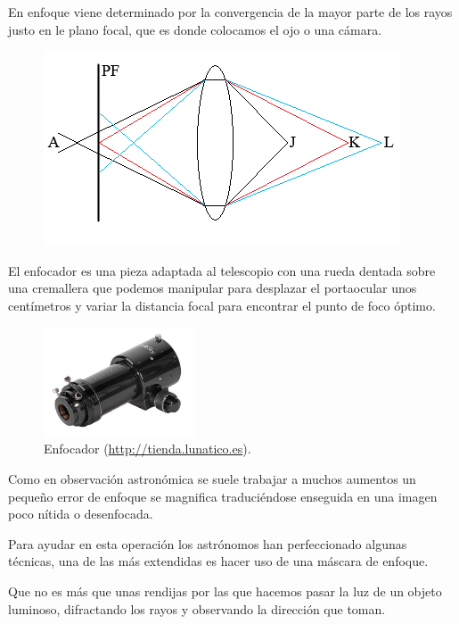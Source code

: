 En enfoque viene determinado por la convergencia de la mayor parte de los rayos justo en le plano focal, que es donde colocamos el ojo o una cámara. 

\begin{figure}[h]
\centering
\includegraphics[width=0.7\linewidth]{../images/planofocal}
\caption{}
\label{fig:planofocal}
\end{figure}

\bigskip
El enfocador es una pieza adaptada al telescopio con una rueda dentada sobre una cremallera que podemos manipular para desplazar el portaocular unos centímetros y variar la distancia focal para encontrar el punto de foco óptimo.


\begin{figure}[h]
	\begin{center}
		\includegraphics[width=0.4\textwidth]{../images/enfocador.jpg}
		\caption[Enfocador]{Enfocador (\href{http://tienda.lunatico.es}{http://tienda.lunatico.es}).}
		\label{fig:diag_scrum}
	\end{center}
\end{figure}


\bigskip
Como en observación astronómica se suele trabajar a muchos aumentos un pequeño error de enfoque se magnifica traduciéndose enseguida en una imagen poco nítida o desenfocada.


\bigskip
Para ayudar en esta operación los astrónomos han perfeccionado algunas técnicas, una de las más extendidas es hacer uso de una máscara de enfoque. \cite{FocusMascara}

\bigskip
Que no es más que unas rendijas por las que hacemos pasar la luz de un objeto luminoso, difractando los rayos y observando la dirección que toman.


